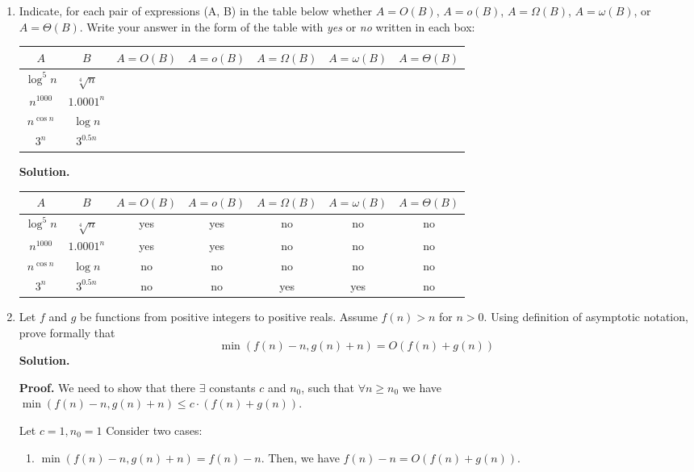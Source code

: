 \documentclass{article}
\begin{document}
\begin{enumerate}
    \item Indicate, for each pair of expressions (A, B) in the table below whether $A = O(B)$, $A = o(B)$, $A = \Omega(B)$, $A = \omega(B)$, or $A = \Theta(B)$. Write your answer in the form of the table with \textit{yes} or \textit{no} written in each box:
    \begin{center}
    \begin{tabular}{ |c|c||c|c|c|c|c| } 
     \hline
     $A$ & $B$ & $A = O(B)$ & $A = o(B)$ & $A = \Omega(B)$ & $A = \omega(B)$ & $A = \Theta(B)$ \\ 
     \hline\hline
     $\log^5{n}$ & $\sqrt[4]{n}$ & & & & & \\
     \hline
     $n^{1000}$ & $1.0001^n$ & & & & & \\
     \hline
     $n^{\cos{n}}$ & $\log{n}$ & & & & & \\
     \hline
     $3^n$ & $3^{0.5n}$ & & & & & \\
     \hline
    \end{tabular}
    \end{center}
    \textbf{Solution.}
    \begin{center}
    \begin{tabular}{ |c|c||c|c|c|c|c| } 
     \hline
     $A$ & $B$ & $A = O(B)$ & $A = o(B)$ & $A = \Omega(B)$ & $A = \omega(B)$ & $A = \Theta(B)$ \\ 
     \hline\hline
     $\log^5{n}$ & $\sqrt[4]{n}$ & yes & yes & no & no & no \\
     \hline
     $n^{1000}$ & $1.0001^n$ & yes & yes & no & no & no \\
     \hline
     $n^{\cos{n}}$ & $\log{n}$ & no & no & no & no & no \\
     \hline
     $3^n$ & $3^{0.5n}$ & no & no & yes & yes & no \\
     \hline
    \end{tabular}
    \end{center}

    \item Let $f$ and $g$ be functions from positive integers to positive reals. Assume $f(n) > n$ for $n > 0$. Using definition of asymptotic notation, prove formally that
    \[\min(f(n) - n, g(n) + n) = O(f(n) + g(n))\]
    \textbf{Solution.}
    
    \textbf{Proof.} We need to show that there $\exists$ constants $c$ and $n_0$, such that $\forall n \geq n_0$ we have $\min(f(n) - n, g(n) + n) \leq c \cdot (f(n) + g(n))$.

    Let $c = 1, n_0 = 1$
    Consider two cases:
    \begin{enumerate}
        \item $\min(f(n) - n, g(n) + n) = f(n) - n$. Then, we have $f(n) - n = O(f(n) + g(n))$.
        

\end{enumerate}
\end{enumerate}
\end{document}
